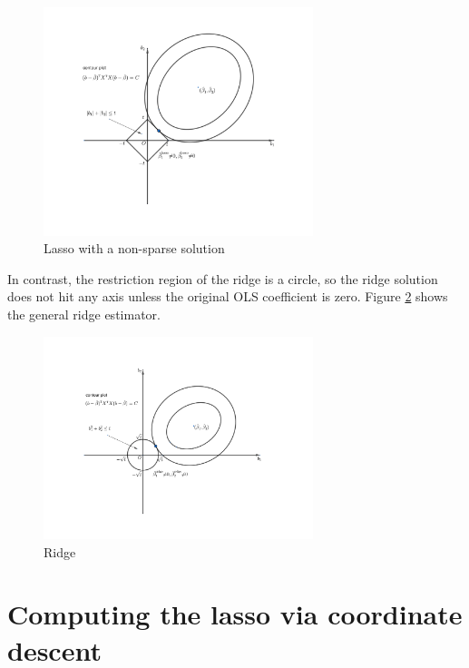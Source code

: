\begin{figure}
\centering 
\includegraphics[width = 0.7\textwidth]{figures/lassogeometry2.pdf}
\caption{Lasso with a non-sparse solution}\label{fig::lasso-non-sparse}

\end{figure}


In contrast, the restriction region of the ridge is a circle, so the ridge solution does not hit any axis unless the original OLS coefficient is zero. Figure \ref{fig::ridge-non-sparse} shows the general ridge estimator. 

\begin{figure}
\centering 
\includegraphics[width = 0.7\textwidth]{figures/ridgegeometry.pdf}
\caption{Ridge}
\label{fig::ridge-non-sparse}

\end{figure}


\section{Computing the lasso via coordinate descent}



